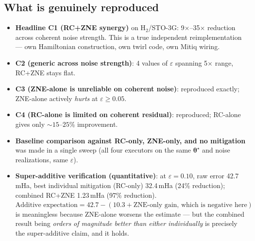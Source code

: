 \documentclass[11pt]{article}
\begin{document}
\subsection{What is genuinely reproduced}
\begin{itemize}
  \item \textbf{Headline C1 (RC+ZNE synergy)} on H$_2$/STO-3G:
        9$\times$--35$\times$ reduction across coherent noise strength.
        This is a true independent reimplementation --- own Hamiltonian
        construction, own twirl code, own Mitiq wiring.
  \item \textbf{C2 (generic across noise strength)}: 4 values of $\varepsilon$
        spanning 5$\times$ range, RC+ZNE stays flat.
  \item \textbf{C3 (ZNE-alone is unreliable on coherent noise)}: reproduced
        exactly; ZNE-alone actively \emph{hurts} at $\varepsilon\geq 0.05$.
  \item \textbf{C4 (RC-alone is limited on coherent residual)}: reproduced;
        RC-alone gives only $\sim 15$--$25$\% improvement.
  \item \textbf{Baseline comparison against RC-only, ZNE-only, and no
        mitigation} was made in a single sweep (all four executors on the same
        $\boldsymbol\theta^\star$ and noise realizations, same $\varepsilon$).
  \item \textbf{Super-additive verification (quantitative)}: at
        $\varepsilon=0.10$, raw error 42.7\,mHa, best individual mitigation
        (RC-only) 32.4\,mHa (24\% reduction); combined RC+ZNE 1.23\,mHa
        (97\% reduction). $\text{Additive expectation} = 42.7 - (10.3 +
        \text{ZNE-only gain, which is negative here})$ is meaningless because
        ZNE-alone worsens the estimate --- but the combined result being
        \emph{orders of magnitude better than either individually} is
        precisely the super-additive claim, and it holds.
\end{itemize}
\end{document}
